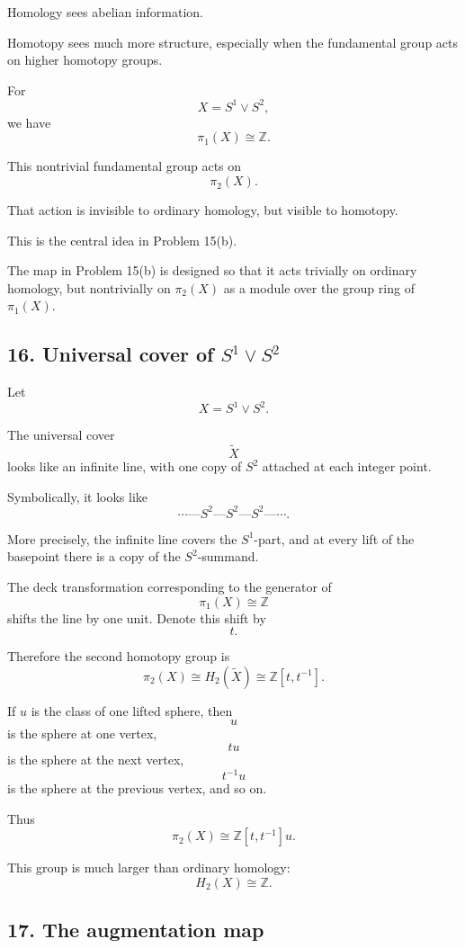 \documentclass[12pt,a4paper]{article}
\theoremstyle{notespace}
\begin{document}
Homology sees abelian information.

Homotopy sees much more structure, especially when the fundamental group acts on higher homotopy groups.

For
\[
X=S^1\vee S^2,
\]
we have
\[
\pi_1(X)\cong \mathbb Z.
\]

This nontrivial fundamental group acts on
\[
\pi_2(X).
\]

That action is invisible to ordinary homology, but visible to homotopy.

This is the central idea in Problem 15(b).

The map in Problem 15(b) is designed so that it acts trivially on ordinary homology, but nontrivially on \(\pi_2(X)\) as a module over the group ring of \(\pi_1(X)\).

\subsection*{16. Universal cover of \(S^1\vee S^2\)}

Let
\[
X=S^1\vee S^2.
\]

The universal cover
\[
\widetilde X
\]
looks like an infinite line, with one copy of \(S^2\) attached at each integer point.

Symbolically, it looks like
\[
\cdots
\text{---}
S^2
\text{---}
S^2
\text{---}
S^2
\text{---}
\cdots.
\]

More precisely, the infinite line covers the \(S^1\)-part, and at every lift of the basepoint there is a copy of the \(S^2\)-summand.

The deck transformation corresponding to the generator of
\[
\pi_1(X)\cong \mathbb Z
\]
shifts the line by one unit. Denote this shift by
\[
t.
\]

Therefore the second homotopy group is
\[
\pi_2(X)\cong H_2(\widetilde X)\cong \mathbb Z[t,t^{-1}].
\]

If \(u\) is the class of one lifted sphere, then
\[
u
\]
is the sphere at one vertex,
\[
tu
\]
is the sphere at the next vertex,
\[
t^{-1}u
\]
is the sphere at the previous vertex,
and so on.

Thus
\[
\pi_2(X)\cong \mathbb Z[t,t^{-1}]u.
\]

This group is much larger than ordinary homology:
\[
H_2(X)\cong \mathbb Z.
\]

\subsection*{17. The augmentation map}
\end{document}
